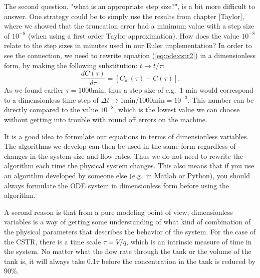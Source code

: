 \documentclass[graybox,sectrefs,envcountresetchap,open=right,final]{svmonodo}
\newenvironment{graybox2admon}[1][]{
\begin{graybox2mdframed}[frametitle=#1]
}
{
\end{graybox2mdframed}
}
\begin{document}
The second question, "what is an appropriate step size?",  is a bit more difficult to answer.
One strategy could be to simply use the results from chapter [Taylor], where we showed that the truncation error had a minimum value
with a step size of $10^{-8}$  (when using a first order Taylor approximation).
How does the value $10^{-8}$ relate to the step sizes in minutes used in our Euler implementation?
In order to see the connection, we need to rewrite equation (\ref{eq:ode:cstr2}) in a dimensionless form,
by making the following substitution:
 $t\to t/\tau$:
\begin{equation}
\frac{dC(\tau)}{d\tau} = \left[C_\text{in}(\tau) - C(\tau)\right].\label{eq:ode:cstr2dim}
\end{equation}
As we found earlier $\tau = 1000$min, thus a step size of e.g.~1 min would correspond to a dimensionless time step of 
$\Delta t\to$1min/1000min$=10^{-3}$. This number can be directly compared to the value $10^{-8}$, which is the lowest value we can
choose without getting into trouble with round off errors on the machine. 


\begin{graybox2admon}[Dimensionless variables]
It is a  good idea to formulate our equations in terms of dimensionless variables.
The algorithms we develop can then be used in the same form regardless of changes in the system size and flow rates.
Thus we do not need to rewrite the algorithm each time the physical system changes. This also means that if you use
an algorithm developed by someone else (e.g.~in Matlab or Python), you should always formulate the ODE system in dimensionless form before using the algorithm.

A second reason is that from a pure modeling point of view, dimensionless variables is a way of getting some
understanding of what kind of combination of the physical parameters that describes the behavior of the system.
For the case of the CSTR, there is a time scale $\tau=V/q$, which 
is an intrinsic measure of time in the system. No matter what the flow rate through the tank or the volume of the tank is,
it will always take  0.1$\tau$ before
the concentration in the tank is reduced by 90\%.
\end{graybox2admon}
\end{document}
